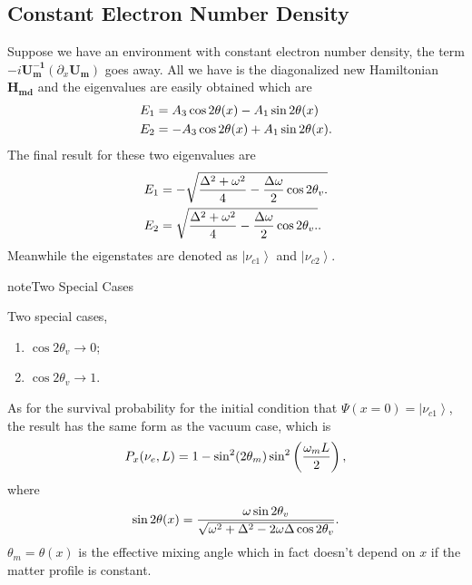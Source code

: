 \documentclass[letterpaper,12pt,english]{sphinxmanual}
\newcommand{\ket}[1]{\left| #1\right\rangle}
\begin{document}
\subsection{Constant Electron Number Density}
\label{msw:constant-electron-number-density}
Suppose we have an environment with constant electron number density, the term \(- i \mathbf{U_m^{-1}} ( \partial_x \mathbf{U_m} )\) goes away. All we have is the diagonalized new Hamiltonian \(\mathbf{H_{md}}\) and the eigenvalues are easily obtained which are
\begin{gather}
\begin{split}E_1 &= A_3\cos 2\theta(x) - A_1 \sin 2\theta(x) \\
E_2 & = - A_3 \cos 2\theta(x) + A_1 \sin 2\theta(x) .\end{split}\notag
\end{gather}
The final result for these two eigenvalues are
\begin{gather}
\begin{split}E_1 &= -\sqrt{ \frac{\Delta^2 + \omega^2 }{4} - \frac{\Delta \omega }{2} \cos 2\theta_v. } \\
E_2 &= \sqrt{ \frac{\Delta^2 + \omega^2 }{4} - \frac{\Delta \omega }{2} \cos 2\theta_v. }.\end{split}\notag
\end{gather}
Meanwhile the eigenstates are denoted as \(\ket{\nu_{c1}}\) and \(\ket{\nu_{c2}}\).

\begin{notice}{note}{Two Special Cases}

Two special cases,
\begin{enumerate}
\item {} 
\(\cos 2\theta_v \to 0\);

\item {} 
\(\cos 2\theta_v \to 1\).

\end{enumerate}
\end{notice}

As for the survival probability for the initial condition that \(\Psi(x=0)=\ket{\nu_{c1}}\), the result has the same form as the vacuum case, which is
\begin{gather}
\begin{split}P_x(\nu_e,L) = 1 - \sin^2(2\theta_m)\sin^2\left( \frac{\omega_m L}{2} \right) ,\end{split}\notag
\end{gather}
where
\begin{gather}
\begin{split}\sin 2\theta(x)  = \frac{\omega\sin 2\theta_v}{\sqrt{ \omega^2+\Delta^2 - 2 \omega \Delta\cos 2\theta_v }}.\end{split}\notag
\end{gather}
\(\theta_m = \theta(x)\) is the effective mixing angle which in fact doesn't depend on \(x\) if the matter profile is constant.
\end{document}
